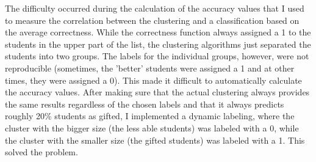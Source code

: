 The difficulty occurred during the calculation of the accuracy values that I used to measure the correlation between the clustering and a classification based on the average correctness. While the correctness function always assigned a 1 to the students in the upper part of the list, the clustering algorithms just separated the students into two groups. The labels for the individual groups, however, were not reproducible (sometimes, the 'better' students were assigned a 1 and at other times, they were assigned a 0). This made it difficult to automatically calculate the accuracy values. After making sure that the actual clustering always provides the same results regardless of the chosen labels and that it always predicts roughly 20\% students as gifted, I implemented a dynamic labeling, where the cluster with the bigger size (the less able students) was labeled with a 0, while the cluster with the smaller size (the gifted students) was labeled with a 1. This solved the problem.  


